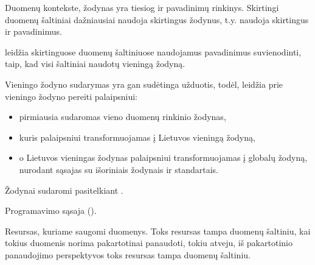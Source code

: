 \documentclass[letterpaper,10pt,lithuanian]{sphinxmanual}
\begin{document}
\begin{description}
\sphinxAtStartPar
Duomenų kontekste, žodynas yra tiesiog {\hyperref[\detokenize{savokos:term-modelis}]{}} ir
{\hyperref[\detokenize{savokos:term-savybe}]{}} pavadinimų rinkinys. Skirtingi duomenų
šaltiniai dažniausiai naudoja skirtingus žodynus, t.y. naudoja
skirtingus {\hyperref[\detokenize{savokos:term-modelis}]{}} ir {\hyperref[\detokenize{savokos:term-savybe}]{}}
pavadinimus.

\sphinxAtStartPar
{\hyperref[\detokenize{savokos:term-DSA}]{}} leidžia skirtinguose duomenų
šaltiniuose naudojamus pavadinimus suvienodinti, taip, kad visi
šaltiniai naudotų vieningą žodyną.

\sphinxAtStartPar
Vieningo žodyno sudarymas yra gan sudėtinga užduotis, todėl, {\hyperref[\detokenize{savokos:term-DSA}]{}}
leidžia prie vieningo žodyno pereiti palaipsniui:
\begin{itemize}
\item {} 
\sphinxAtStartPar
pirmiausia sudaromas vieno duomenų rinkinio žodynas,

\item {} 
\sphinxAtStartPar
kuris palaipsniui transformuojamas į Lietuvos vieningą žodyną,

\item {} 
\sphinxAtStartPar
o Lietuvos vieningas žodynas palaipsniui transformuojamas į globalų
žodyną, nurodant sąsajas su išoriniais žodynais ir standartais.

\end{itemize}

\sphinxAtStartPar
Žodynai sudaromi pasitelkiant .

\sphinxAtStartPar
Programavimo sąsaja ().

\sphinxAtStartPar
Resursas, kuriame saugomi duomenys. Toks resursas tampa duomenų
šaltiniu, kai tokius duomenis norima pakartotinai panaudoti, tokiu
atveju, iš pakartotinio panaudojimo perspektyvos toks resursas tampa
duomenų šaltiniu.


\end{description}
\end{document}

